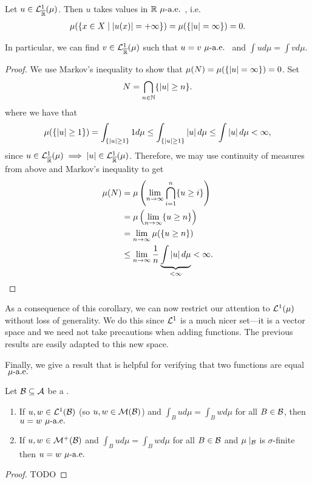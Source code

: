 \begin{cor}
	Let $u \in \mathcal{L}^1_{\overline{\mathbb{R}}}(\mu)$. Then $u$ takes values in $\mathbb{R} \ \mu\text{-a.e. }$, i.e.
	\begin{align*}
		\mu(\{x \in X \mid \left\vert{u(x)}\right\vert = +\infty\}) = \mu(\{\left\vert{u}\right\vert = \infty\}) = 0.
	\end{align*}
	
	In particular, we can find $v \in \mathcal{L}^1_{\overline{\mathbb{R}}}(\mu)$ such that $u = v \ \mu\text{-a.e. }$ and $\int u d\mu = \int v d\mu$.
\end{cor}

\begin{proof}
	We use Markov's inequality to show that $\mu(N) = \mu(\{\left\vert{u}\right\vert = \infty\}) = 0$. Set
	\begin{align*}
		N = \bigcap_{n\in\mathbb{N}} \{\left\vert{u}\right\vert \geq n\}.
	\end{align*}
	where we have that
	\begin{align*}
		\mu(\{\left\vert{u}\right\vert \geq 1\})
		= \int_{\{\left\vert{u}\right\vert \geq 1\}} 1 d\mu
		\leq \int_{\{\left\vert{u}\right\vert \geq 1\}} \left\vert{u}\right\vert d\mu
		\leq \int \left\vert{u}\right\vert d\mu < \infty,
	\end{align*}
	since $u \in \mathcal{L}^1_{\overline{\mathbb{R}}}(\mu) \implies \left\vert{u}\right\vert \in \mathcal{L}^1_{\overline{\mathbb{R}}}(\mu)$. Therefore, we may use continuity of measures from above and Markov's inequality to get
	\begin{align*}
		\mu(N)
		&= \mu\left( \lim_{n\to\infty} \bigcap_{i = 1}^n \{u \geq i\} \right) \\
		&= \mu\left( \lim_{n\to\infty} \{u \geq n\}\right) \\
		&= \lim_{n\to\infty} \mu(\{u \geq n\}) \\
		&\leq \lim_{n\to\infty} \frac{1}{n} \underbrace{\int \left\vert{u}\right\vert d\mu}_{< \infty} < \infty.
	\end{align*}
\end{proof}

As a consequence of this corollary, we can now restrict our attention to $\mathcal{L}^1(\mu)$ without loss of generality. We do this since $\mathcal{L}^1$ is a much nicer set---it is a vector space and we need not take precautions when adding functions. The previous results are easily adapted to this new space.

Finally, we give a result that is helpful for verifying that two functions are equal $\ \mu\text{-a.e. }$

\begin{cor}
	Let $\mathcal{B} \subseteq \mathcal{A}$ be a \siga.
	
	\begin{enumerate}
		\item If $u, w \in \mathcal{L}^1(\mathcal{B})$ (so $u, w \in \mathcal{M}(\mathcal{B})$) and $\int_B u d\mu = \int_B w d\mu$ for all $B \in \mathcal{B}$, then $u = w\ \mu\text{-a.e. }$
		
		\item If $u, w \in \mathcal{M}^+(\mathcal{B})$ and $\int_B u d\mu = \int_B w d\mu$ for all $B \in \mathcal{B}$ and $\mu\mid_{\mathcal{B}}$ is $\sigma$-finite then $u = w \ \mu\text{-a.e. }$
	\end{enumerate}
\end{cor}

\begin{proof}
	TODO
\end{proof}
